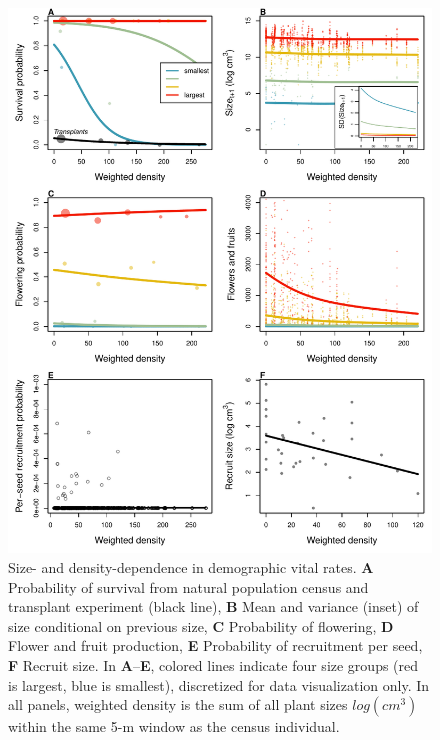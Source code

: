 \documentclass[11pt]{article}\usepackage[]{graphicx}\usepackage[usenames,dvipsnames]{xcolor}
\begin{document}
\begin{figure}[H]
  \begin{center}
    \includegraphics[width=\linewidth]{Figures/vital_rates}
  \caption{Size- and density-dependence in demographic vital rates. \textbf{A} Probability of survival from natural population census and transplant experiment (black line), \textbf{B} Mean and variance (inset) of size conditional on previous size, \textbf{C} Probability of flowering, \textbf{D} Flower and fruit production, \textbf{E} Probability of recruitment per seed, \textbf{F} Recruit size.  In \textbf{A}--\textbf{E}, colored lines indicate four size groups (red is largest, blue is smallest), discretized for data visualization only. In all panels, weighted density is the sum of all plant sizes $log(cm^3)$ within the same 5-m window as the census individual.}
  \label{fig:vital_rates}
  \end{center}
\end{figure}
\end{document}
